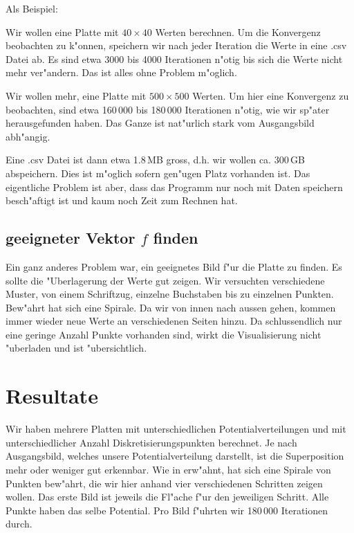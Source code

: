 \begin{refsection}
\begin{shadedSmaller}
Als Beispiel:
			
Wir wollen eine Platte mit  $40 \times 40$ Werten berechnen. Um die
Konvergenz beobachten zu k"onnen, speichern wir nach jeder Iteration
die Werte in eine .csv Datei ab. Es sind etwa 3000 bis 4000 Iterationen
n"otig bis sich die Werte nicht mehr ver"andern. Das ist alles ohne
Problem m"oglich.
			
Wir wollen mehr, eine Platte mit $500 \times 500$ Werten. Um hier
eine Konvergenz zu beobachten, sind etwa 160\,000 bis 180\,000
Iterationen n"otig, wie wir sp"ater herausgefunden haben. Das Ganze
ist nat"urlich stark vom Ausgangsbild abh"angig.

Eine .csv Datei ist dann etwa 1.8\,MB gross, d.h. wir wollen ca.
300\,GB abspeichern. Dies ist m"oglich sofern gen"ugen Platz vorhanden
ist. Das eigentliche  Problem ist aber, dass das Programm nur noch
mit Daten speichern besch"aftigt ist und kaum noch Zeit zum Rechnen
hat.
\end{shadedSmaller}
	
\subsection{geeigneter Vektor $f$ finden}\label{sec:geeignetesF}

Ein ganz anderes Problem war, ein geeignetes Bild f"ur die Platte zu finden.
Es sollte die "Uberlagerung der Werte gut zeigen. Wir versuchten
verschiedene Muster, von einem Schriftzug, einzelne Buchstaben bis
zu einzelnen Punkten. Bew"ahrt hat sich eine Spirale. Da wir von
innen nach aussen gehen, kommen immer wieder neue Werte an verschiedenen
Seiten hinzu. Da schlussendlich nur eine geringe Anzahl Punkte
vorhanden sind, wirkt die Visualisierung nicht "uberladen und ist
"ubersichtlich.
		
\section{Resultate}

Wir haben mehrere Platten mit unterschiedlichen Potentialverteilungen
und mit unterschiedlicher Anzahl Diskretisierungspunkten berechnet.
Je nach Ausgangsbild, welches unsere Potentialverteilung darstellt,
ist die Superposition mehr oder weniger gut erkennbar. Wie in
 erw"ahnt, hat sich eine Spirale von Punkten
bew"ahrt, die wir hier anhand vier verschiedenen Schritten zeigen
wollen. Das erste Bild ist jeweils die Fl"ache f"ur den jeweiligen
Schritt. Alle Punkte haben das selbe Potential. Pro Bild f"uhrten
wir 180\,000 Iterationen durch.


\end{refsection}
